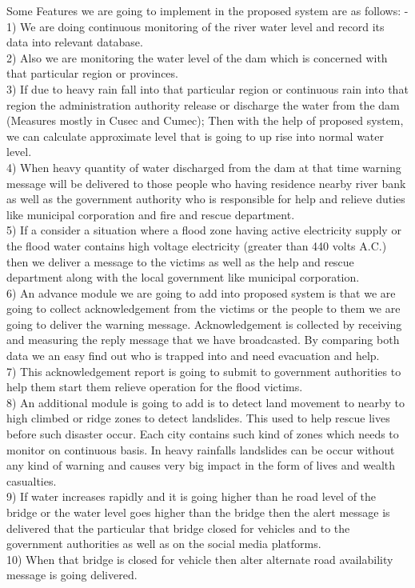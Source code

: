 \documentclass[a4paper,12pt]{report}
\begin{document}
\begin{itemize}
Some Features we are going to implement in the proposed system are as follows: -\\
1)	We are doing continuous monitoring of the river water level and record its data into relevant database.\\
2)	Also we are monitoring the water level of the dam which is concerned with that particular region or provinces.\\
3)	If due to heavy rain fall into that particular region or continuous rain into that region the administration authority release or discharge the water from the dam (Measures mostly in Cusec and Cumec); Then with the help of proposed system, we can calculate approximate level that is going to up rise into normal water level.\\
4)	When heavy quantity of water discharged from the dam at that time warning message will be delivered to those people who having residence nearby river bank as well as the government authority who is responsible for help and relieve duties like municipal corporation and fire and rescue department.\\
5)	If a consider a situation where a flood zone having active electricity supply or the flood water contains high voltage electricity (greater than 440 volts A.C.) then we deliver a message to the victims as well as the help and rescue department along with the local government like municipal corporation.\\
6)	An advance module we are going to add into proposed system is that we are going to collect acknowledgement from the victims or the people to them we are going to deliver the warning message. Acknowledgement is collected by receiving and measuring the reply message that we have broadcasted. By comparing both data we an easy find out who is trapped into and need evacuation and help.\\
7)	This acknowledgement report is going to submit to government authorities to help them start them relieve operation for the flood victims.\\
8)	An additional module is going to add is to detect land movement to nearby to high climbed or ridge zones to detect landslides. This used to help rescue lives before such disaster occur. Each city contains such kind of zones which needs to monitor on continuous basis. In heavy rainfalls landslides can be occur without any kind of warning and causes very big impact in the form of lives and wealth casualties.\\
9)	If water increases rapidly and it is going higher than he road level of the bridge or the water level goes higher than the bridge then the alert message is delivered that the particular that bridge closed for vehicles and to the government authorities as well as on the social media platforms.\\
10)	When that bridge is closed for vehicle then alter alternate road availability message is going delivered.
 


\end{itemize}
\end{document}
